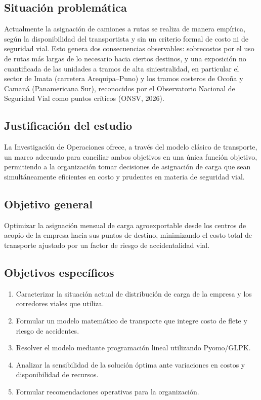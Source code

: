 \documentclass[11pt,a4paper]{article}
\begin{document}
\subsection{Situaci\'on problem\'atica}
Actualmente la asignaci\'on de camiones a rutas se realiza de manera emp\'irica, seg\'un la disponibilidad del transportista y sin un criterio formal de costo ni de seguridad vial. Esto genera dos consecuencias observables: sobrecostos por el uso de rutas m\'as largas de lo necesario hacia ciertos destinos, y una exposici\'on no cuantificada de las unidades a tramos de alta siniestralidad, en particular el sector de Imata (carretera Arequipa--Puno) y los tramos costeros de Oco\~na y Caman\'a (Panamericana Sur), reconocidos por el Observatorio Nacional de Seguridad Vial como puntos cr\'iticos (ONSV, 2026).

\subsection{Justificaci\'on del estudio}
La Investigaci\'on de Operaciones ofrece, a trav\'es del modelo cl\'asico de transporte, un marco adecuado para conciliar ambos objetivos en una \'unica funci\'on objetivo, permitiendo a la organizaci\'on tomar decisiones de asignaci\'on de carga que sean simult\'aneamente eficientes en costo y prudentes en materia de seguridad vial.

\subsection{Objetivo general}
Optimizar la asignaci\'on mensual de carga agroexportable desde los centros de acopio de la empresa hacia sus puntos de destino, minimizando el costo total de transporte ajustado por un factor de riesgo de accidentalidad vial.

\subsection{Objetivos espec\'ificos}
\begin{enumerate}[label=\alph*)]
  \item Caracterizar la situaci\'on actual de distribuci\'on de carga de la empresa y los corredores viales que utiliza.
  \item Formular un modelo matem\'atico de transporte que integre costo de flete y riesgo de accidentes.
  \item Resolver el modelo mediante programaci\'on lineal utilizando Pyomo/GLPK.
  \item Analizar la sensibilidad de la soluci\'on \'optima ante variaciones en costos y disponibilidad de recursos.
  \item Formular recomendaciones operativas para la organizaci\'on.
\end{enumerate}
\end{document}
